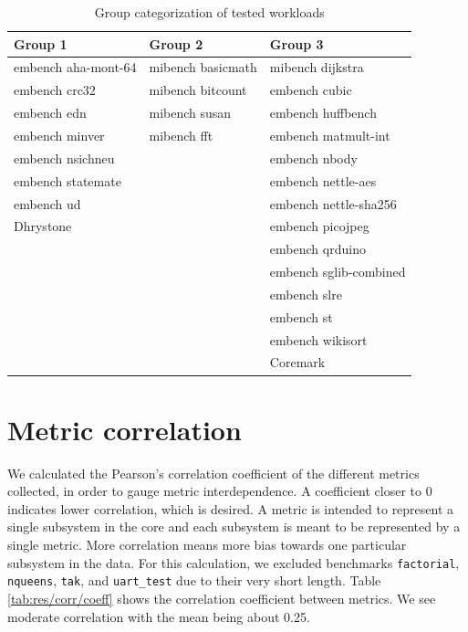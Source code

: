 \documentclass[../bachelor_paper.tex]{subfiles}
\begin{document}
\begin{table}
    \centering
    \caption{Group categorization of tested workloads}
    \label{tab:res/temp/categorization}
    \begin{tabular}{lll}
        Group 1             & Group 2           & Group 3       \\
        \hline
        embench aha-mont-64 & mibench basicmath & mibench dijkstra    \\
        embench crc32       & mibench bitcount  & embench cubic   \\
        embench edn         & mibench susan     & embench huffbench   \\
        embench minver      & mibench fft       & embench matmult-int \\
        embench nsichneu    &                   & embench nbody   \\
        embench statemate   &                   & embench nettle-aes  \\
        embench ud          &                   & embench nettle-sha256   \\
        Dhrystone           &                   & embench picojpeg    \\
                            &                   & embench qrduino \\
                            &                   & embench sglib-combined  \\
                            &                   & embench slre    \\
                            &                   & embench st  \\
                            &                   & embench wikisort    \\
                            &                   & Coremark    
    \end{tabular}
\end{table}

\section{Metric correlation}
    \label{sec:res/corr}
We calculated the Pearson's correlation coefficient of the different metrics collected, in order to gauge metric interdependence. A coefficient closer to 0 indicates lower correlation, which is desired. A metric is intended to represent a single subsystem in the core and each subsystem is meant to be represented by a single metric. More correlation means more bias towards one particular subsystem in the data. For this calculation, we excluded benchmarks \texttt{factorial}, \texttt{nqueens}, \texttt{tak}, and \texttt{uart\_test} due to their very short length. Table \ref{tab:res/corr/coeff} shows the correlation coefficient between metrics. We see moderate correlation with the mean being about 0.25. 
\end{document}
